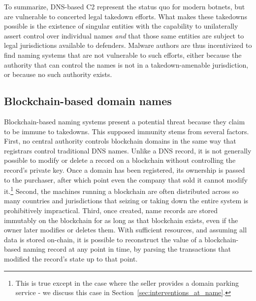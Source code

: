 To summarize, DNS-based C2 represent the status quo for modern
botnets, but are vulnerable to concerted legal takedown efforts.  What
makes these takedowns possible is the existence of singular entities
with the capability to unilaterally assert control over individual
names \emph{and} that those same entities are subject to legal
jurisdictions available to defenders.  Malware authors are thus
incentivized to find naming systems that are not vulnerable to such
efforts, either because the authority that can control the names is
not in a takedown-amenable jurisdiction, or because no such authority
exists.


\subsection{Blockchain-based domain names}

Blockchain-based naming systems present a potential threat 
because they claim to be immune to takedowns. This supposed immunity stems 
from several factors. 
First, no central authority 
controls blockchain domains in the same way that registrars 
control traditional DNS names. Unlike a DNS record, it is not generally 
possible 
to modify or delete a record on a blockchain without controlling the record's 
private key. Once a domain has been registered, its ownership is passed to the 
purchaser, after which 
point even the company that 
sold it cannot modify it.\footnote{This is true except in the case where the 
seller provides a domain parking service - we discuss this case in 	
Section~\ref{sec:interventions_at_name}.}
Second, the machines running a blockchain are often distributed across so many 
countries and jurisdictions that seizing or taking down the entire system is 
prohibitively impractical. 
Third, once created, name records are stored immutably on the 
blockchain for as long as that blockchain exists, even if the owner later 
modifies or deletes them. With sufficient resources, and assuming all data is 
stored on-chain, it is possible to reconstruct the value of a 
blockchain-based naming record at any point in time, by parsing the 
transactions that modified the record's state up to that point.

